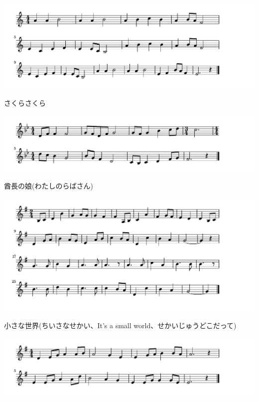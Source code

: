 \documentclass[a4paper]{ltjsarticle}
\begin{document}
\includegraphics[clip]{sakura_crop.pdf}

\vspace{-10mm} \hspace{10mm}
さくらさくら



\includegraphics[clip]{shuchou_crop.pdf}

\vspace{-10mm} \hspace{10mm}
酋長の娘(わたしのらばさん)




\includegraphics[clip]{smallworld_crop.pdf}

\vspace{-10mm} \hspace{10mm}
小さな世界(ちいさなせかい、It's a small world、せかいじゅうどこだって)



\includegraphics[clip]{takedanokomori_crop.pdf}
\end{document}
